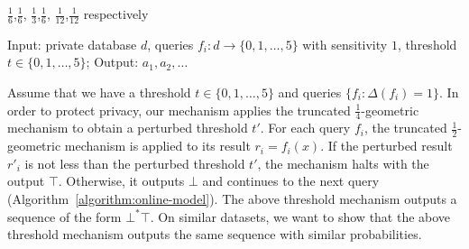 \begin{algorithm}
\begin{algorithmic}[1]
{			$\frac{1}{6}$,$\frac{1}{6}$,
			$\frac{1}{3}$,$\frac{1}{6}$,
			$\frac{1}{12}$,$\frac{1}{12}$ respectively}
		\EndMatch
		\EndFor
		\EndProcedure
		
	\end{algorithmic}
	\caption{Input: private database $d$, 
          queries $f_i : d \rightarrow \{ 0, 1,
          \ldots, 5 \}$ with sensitivity $1$, threshold $t \in \{ 0,
          1, \ldots, 5 \}$; Output: $a_1, a_2, \ldots$}
	\label{algorithm:online-model}
\end{algorithm}

Assume that we have a threshold $t \in \{ 0, 1, \ldots, 5 \}$
and queries $\{ f_i : \Delta
(f_i) = 1 \}$. In order to protect privacy, our mechanism applies the
truncated $\frac{1}{4}$-geometric mechanism to obtain a perturbed
threshold $t'$. For each query $f_i$, the truncated $\frac{1}{2}$-geometric
mechanism is applied to its result $r_i = f_i(x)$. If the perturbed result
$r'_i$ is not less
than the perturbed threshold $t'$, the mechanism halts with the output
$\top$. Otherwise, it outputs $\bot$ and continues to the next query
(Algorithm~\ref{algorithm:online-model}). The above threshold
mechanism outputs a sequence of the form $\bot^* \top$. On
similar datasets, we want to show that the above
threshold mechanism outputs the same sequence with similar
probabilities. 


